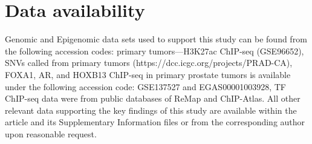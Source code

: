 \section{Data availability}

Genomic and Epigenomic data sets used to support this study can be found from the following accession codes: primary tumors—H3K27ac ChIP-seq (GSE96652), SNVs called from primary tumors (https://dcc.icgc.org/projects/PRAD-CA), FOXA1, AR, and HOXB13 ChIP-seq in primary prostate tumors is available under the following accession code: GSE137527 and EGAS00001003928, TF ChIP-seq data were from public databases of ReMap and ChIP-Atlas.
All other relevant data supporting the key findings of this study are available within the article and its Supplementary Information files or from the corresponding author upon reasonable request.
